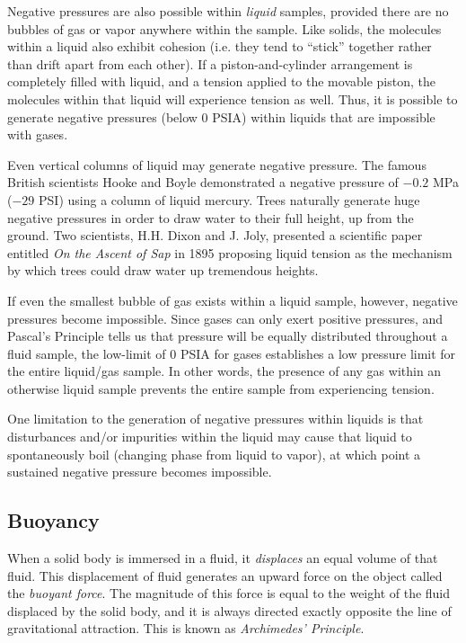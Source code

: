 \vskip 10pt

Negative pressures are also possible within \textit{liquid} samples, provided there are no bubbles of gas or vapor anywhere within the sample.  Like solids, the molecules within a liquid also exhibit cohesion (i.e. they tend to ``stick'' together rather than drift apart from each other).  If a piston-and-cylinder arrangement is completely filled with liquid, and a tension applied to the movable piston, the molecules within that liquid will experience tension as well.  Thus, it is possible to generate negative pressures (below 0 PSIA) within liquids that are impossible with gases.

Even vertical columns of liquid may generate negative pressure.  The famous British scientists Hooke and Boyle demonstrated a negative pressure of $-0.2$ MPa ($-29$ PSI) using a column of liquid mercury.  Trees naturally generate huge negative pressures in order to draw water to their full height, up from the ground.  Two scientists, H.H. Dixon and J. Joly, presented a scientific paper entitled \textit{On the Ascent of Sap} in 1895 proposing liquid tension as the mechanism by which trees could draw water up tremendous heights.

If even the smallest bubble of gas exists within a liquid sample, however, negative pressures become impossible.  Since gases can only exert positive pressures, and Pascal's Principle tells us that pressure will be equally distributed throughout a fluid sample, the low-limit of 0 PSIA for gases establishes a low pressure limit for the entire liquid/gas sample.  In other words, the presence of any gas within an otherwise liquid sample prevents the entire sample from experiencing tension.

\vskip 10pt

One limitation to the generation of negative pressures within liquids is that disturbances and/or impurities within the liquid may cause that liquid to spontaneously boil (changing phase from liquid to vapor), at which point a sustained negative pressure becomes impossible.






\filbreak
\subsection{Buoyancy}

\label{Physics of buoyancy}

When a solid body is immersed in a fluid, it \textit{displaces} an equal volume of that fluid.  This displacement of fluid generates an upward force on the object called the \textit{buoyant force}.  The magnitude of this force is equal to the weight of the fluid displaced by the solid body, and it is always directed exactly opposite the line of gravitational attraction.  This is known as \textit{Archimedes' Principle}.    

